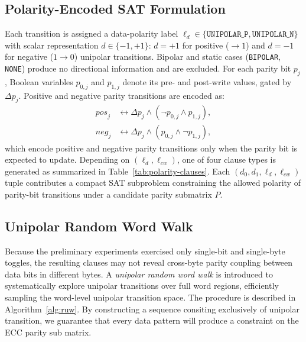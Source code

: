 \subsection{Polarity-Encoded SAT Formulation}
\label{sec:sat-encoding} Each transition is assigned a data-polarity
label $\ell_d \in \{\texttt{UNIPOLAR\_P}, \texttt{UNIPOLAR\_N}\}$ with
scalar representation $d \in \{-1, +1\}$: $d=+1$ for positive (${\to}1$)
and $d=-1$ for negative ($1{\to}0$) unipolar transitions. Bipolar and
static cases (\texttt{BIPOLAR}, \texttt{NONE}) produce no directional
information and are excluded. For each parity bit $p_j$, Boolean
variables $p_{0,j}$ and $p_{1,j}$ denote its pre- and post-write values,
gated by $\Delta p_j$. Positive and negative parity transitions are
encoded as:
\begin{align}
	\textit{pos}_j & \leftrightarrow \Delta p_j \wedge (\neg p_{0,j} \wedge p_{1,j}), \\
	\textit{neg}_j & \leftrightarrow \Delta p_j \wedge (p_{0,j} \wedge \neg p_{1,j}),
\end{align}
which encode positive and negative parity transitions only when the
parity bit is expected to update. Depending on $(\ell_d, \ell_{cw})$,
one of four clause types is generated as summarized in
Table~\ref{tab:polarity-clauses}.
 Each $(d_0, d_1, \ell_d,
	\ell_{cw})$ tuple contributes a compact SAT subproblem constraining the
allowed polarity of parity-bit transitions under a candidate parity
submatrix $P$.

\subsection{Unipolar Random Word Walk}
Because the preliminary experiments exercised only single-bit and
single-byte toggles, the resulting clauses may not reveal cross-byte
parity coupling between data bits in different bytes. A \emph{unipolar
	random word walk} is introduced to systematically explore unipolar
transitions over full word regions, efficiently sampling the word-level
unipolar transition space. The procedure is described in
Algorithm~\ref{alg:ruw}. By constructing a sequence consiting
exclusively of unipolar transition, we guarantee that every data pattern
will produce a constraint on the ECC parity sub matrix.




